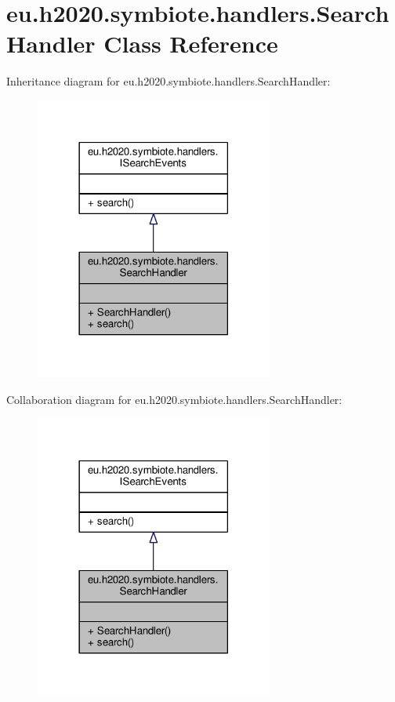 \hypertarget{classeu_1_1h2020_1_1symbiote_1_1handlers_1_1SearchHandler}{}\section{eu.\+h2020.\+symbiote.\+handlers.\+Search\+Handler Class Reference}
\label{classeu_1_1h2020_1_1symbiote_1_1handlers_1_1SearchHandler}


Inheritance diagram for eu.\+h2020.\+symbiote.\+handlers.\+Search\+Handler\+:
\nopagebreak
\begin{figure}[H]
\begin{center}
\leavevmode
\includegraphics[width=222pt]{classeu_1_1h2020_1_1symbiote_1_1handlers_1_1SearchHandler__inherit__graph}
\end{center}
\end{figure}


Collaboration diagram for eu.\+h2020.\+symbiote.\+handlers.\+Search\+Handler\+:
\nopagebreak
\begin{figure}[H]
\begin{center}
\leavevmode
\includegraphics[width=222pt]{classeu_1_1h2020_1_1symbiote_1_1handlers_1_1SearchHandler__coll__graph}
\end{center}
\end{figure}
